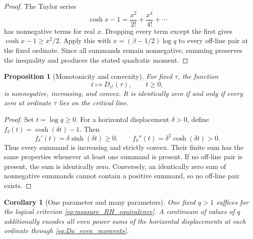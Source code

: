 \documentclass[11pt]{amsart}
\numberwithin{equation}{section}
\theoremstyle{plain}
\newtheorem{proposition}[theorem]{Proposition}
\newtheorem{corollary}[theorem]{Corollary}
\theoremstyle{definition}
\theoremstyle{remark}
\newcommand{\1}{\mathbf{1}}
\begin{document}
\begin{proof}
The Taylor series
\begin{equation}
\cosh x-1
=
\frac{x^2}{2!}+\frac{x^4}{4!}+\cdots
\label{eq:cosh_nonnegative_series}
\end{equation}
has nonnegative terms for real \(x\).  Dropping every term except the first
gives \(\cosh x-1\geq x^2/2\).  Apply this with
\(x=(\beta-1/2)\log q\) to every off-line pair at the fixed ordinate.
Since all summands remain nonnegative, summing preserves the inequality and
produces the stated quadratic moment.
\end{proof}

\begin{proposition}[Monotonicity and convexity]
\label{prop:Dq_monotonicity}
For fixed $\tau$, the function
\begin{equation}
t\longmapsto D_{e^t}(\tau),
\qquad t\geq0,
\label{eq:D_exp_t}
\end{equation}
is nonnegative, increasing, and convex.  It is identically zero if and only
if every zero at ordinate $\tau$ lies on the critical line.
\end{proposition}

\begin{proof}
Set \(t=\log q\geq0\).  For a horizontal displacement \(\delta>0\),
define \(f_\delta(t)=\cosh(\delta t)-1\).  Then
\begin{equation}
f_\delta'(t)=\delta\sinh(\delta t)\geq0,
\qquad
f_\delta''(t)=\delta^2\cosh(\delta t)>0.
\label{eq:Dq_monotonicity_derivatives_detailed}
\end{equation}
Thus every summand is increasing and strictly convex.  Their finite sum has
the same properties whenever at least one summand is present.  If no
off-line pair is present, the sum is identically zero.  Conversely, an
identically zero sum of nonnegative summands cannot contain a positive
summand, so no off-line pair exists.
\end{proof}

\begin{corollary}[One parameter and many parameters]
\label{cor:one_many_q}
One fixed $q>1$ suffices for the logical criterion
\eqref{eq:measure_RH_equivalence}.  A continuum of values of $q$ additionally
encodes all even power sums of the horizontal displacements at each
ordinate through \eqref{eq:Dq_even_moments}.
\end{corollary}
\end{document}
